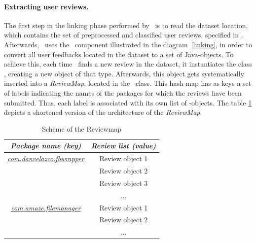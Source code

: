 \paragraph{Extracting user reviews.} 
The first step in the linking phase performed by \toolname\, is to read the dataset location, which contains the set of preprocessed and classified user reviews, specified in \Config.
Afterwards, \toolname\ uses the \ReviewC\ component illustrated in the diagram~\ref{linking}, in order to convert all user feedbacks located in the dataset to a set of Java-objects. 
To achieve this, each time \toolname\ finds a new review in the dataset, it instantiates the class \Review, creating a new object of that type. 
Afterwards, this object gets systematically inserted into a \textit{ReviewMap}, located in the \ReviewC\ class. 
This hash map has as keys a set of labels indicating the names of the packages for which the reviews have been submitted. Thus, each label is associated with its own list of \Review-objects. 
The table \ref{tbl: reviewmap} depicts a shortened version of the architecture of the \textit{ReviewMap}.
\begin{table}[tb]
\centering
\caption{Scheme of the Reviewmap}
\label{tbl: reviewmap}
\begin{tabular}{c|c|}
\hline
\multicolumn{1}{|c|}{\textit{\textbf{Package name (key)}}}    & \textit{\textbf{Review list (value)}} \\ \hline
\multicolumn{1}{|c|}{{\ul \textit{com.danvelazco.fbwrapper}}} & Review object 1                       \\ \hline
                                                              & Review object 2                       \\ \cline{2-2} 
                                                              & Review object 3                       \\ \cline{2-2} 
                                                              & ...                                   \\ \hline
\multicolumn{1}{|c|}{{\ul \textit{com.amaze.filemanager}}}    & Review object 1                       \\ \hline
                                                              & Review object 2                       \\ \cline{2-2} 
                                                              & ...                                   \\ \cline{2-2} 
\end{tabular}
\end{table}
